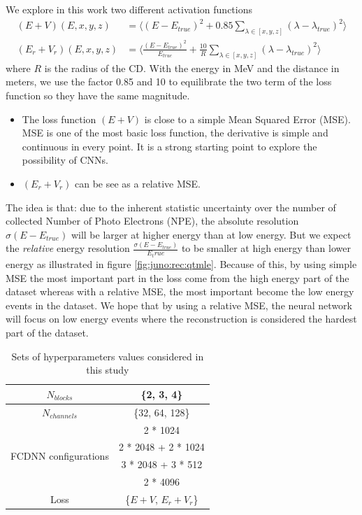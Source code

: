 We explore in this work two different activation functions
\begin{align}
  (E+V)(E, x, y, z) &= \bigg\langle (E - E_{true})^2 + 0.85 \sum_{\lambda \in [x, y, z]} (\lambda - \lambda_{true})^2 \bigg\rangle \\
  (E_r + V_r)(E, x, y, z) &=  \bigg\langle \frac{(E - E_{true}) ^ 2}{E_{true}} + \frac{10}{R} \sum_{\lambda \in [x, y, z]} (\lambda - \lambda_{true})^2 \bigg\rangle
\end{align}
where $R$ is the radius of the CD. With the energy in MeV and the distance in meters, we use the factor 0.85 and 10 to equilibrate the two term of the loss function so they have the same magnitude.
\begin{itemize}
  \item The loss function $(E+V)$ is close to a simple Mean Squared Error (MSE). MSE is one of the most basic loss function, the derivative is simple and continuous in every point. It is a strong starting point to explore the possibility of CNNs.
  \item $(E_r + V_r)$ can be see as a relative MSE.
\end{itemize}
The idea is that: due to the inherent statistic uncertainty over the number of collected Number of Photo Electrons (NPE), the absolute resolution $\sigma (E - E_{true})$ will be larger at higher energy than at low energy. But we expect the \textit{relative} energy resolution $\frac{\sigma(E - E_{true})}{E_true}$ to be smaller at high energy than lower energy as illustrated in figure \ref{fig:juno:rec:qtmle}. Because of this, by using simple MSE the most important part in the loss come from the high energy part of the dataset whereas with a relative MSE, the most important become the low energy events in the dataset. We hope that by using a relative MSE, the neural network will focus on low energy events where the reconstruction is considered the hardest part of the dataset.


\begin{table}[ht]
  \centering
  \begin{tabular}{ | c | c | }
    \hline $N_{blocks}$ & \{2, 3, 4\} \\
    \hline $N_{channels}$ & \{32, 64, 128\} \\
    \hline
    \multirow{4}{*}{FCDNN configurations} & 2 * 1024 \\
                                        & 2 * 2048 + 2 * 1024 \\
                                        & 3 * 2048 + 3 * 512 \\
                                        & 2 * 4096 \\
    \hline
    Loss & \{$E+V$, $E_r + V_r$\} \\
    \hline
  \end{tabular}
  \caption{Sets of hyperparameters values considered in this study}
  \label{tab:jcnn:hyper}
\end{table}

